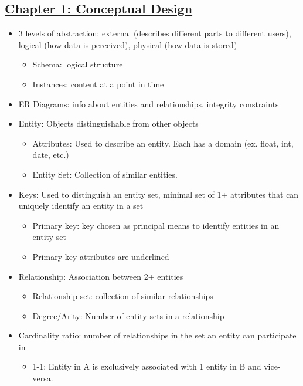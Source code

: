 \documentclass[8pt,landscape,a4paper, fleqn, dvipsnames]{extarticle}
\begin{document}
\begin{multicols*}{4}

\section*{\ul{Chapter 1: Conceptual Design}}
\begin{itemize}
    \item 3 levels of abstraction: external (describes different parts to different users), logical (how data is perceived), physical (how data is stored)
    \begin{itemize}
        \item Schema: logical structure
        \item Instances: content at a point in time
    \end{itemize}
    \item ER Diagrams: info about entities and relationships, integrity constraints
    \item Entity: Objects distinguishable from other objects
    \begin{itemize}
        \item Attributes: Used to describe an entity. Each has a domain (ex. float, int, date, etc.)
        \item Entity Set: Collection of similar entities.
    \end{itemize}
    \item Keys: Used to distinguish an entity set, minimal set of 1+ attributes that can uniquely identify an entity in a set
    \begin{itemize}
        \item Primary key: key chosen as principal means to identify entities in an entity set
        \item Primary key attributes are underlined
    \end{itemize}
    \item Relationship: Association between 2+ entities
    \begin{itemize}
        \item Relationship set: collection of similar relationships
        \item Degree/Arity: Number of entity sets in a relationship 
    \end{itemize}
    \item Cardinality ratio: number of relationships in the set an entity can participate in
    \begin{itemize}
        \item 1-1: Entity in A is exclusively associated with 1 entity in B and vice-versa.

\end{itemize}
\end{itemize}
\end{multicols*}
\end{document}
